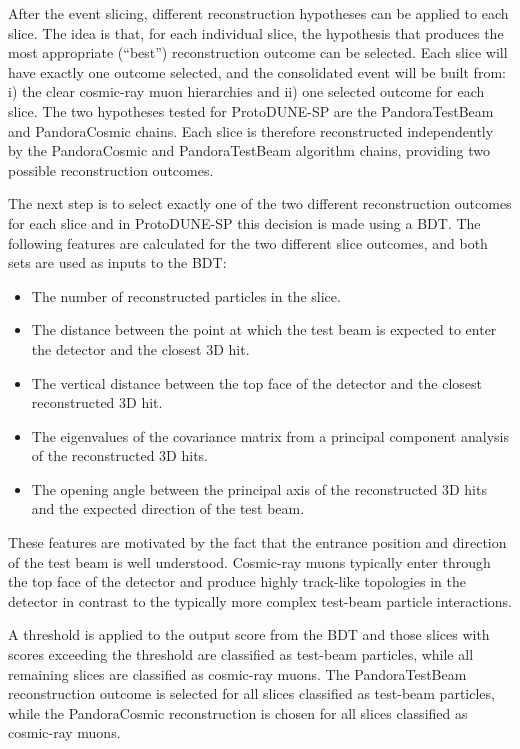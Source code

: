 \documentclass[epjc3]{svjour3}
\begin{document}
After the event slicing, different reconstruction hypotheses can be applied to each slice. The idea is that, for each individual slice, the hypothesis that produces the most appropriate (``best'') reconstruction outcome can be selected. Each slice will have exactly one outcome selected, and the consolidated event will be built from: i) the clear cosmic-ray muon hierarchies and ii) one selected outcome for each slice. The two hypotheses tested for ProtoDUNE-SP are the PandoraTestBeam and PandoraCosmic chains. Each slice is therefore reconstructed independently by the PandoraCosmic and PandoraTestBeam algorithm chains, providing two possible reconstruction outcomes.

The next step is to select exactly one of the two different reconstruction outcomes for each slice and in ProtoDUNE-SP this decision is made using a BDT. The following features are calculated for the two different slice outcomes, and both sets are used as inputs to the BDT:

\begin{itemize}
\item The number of reconstructed particles in the slice.
\item The distance between the point at which the test beam is expected to enter the detector and the closest 3D hit.
\item The vertical distance between the top face of the detector and the closest reconstructed 3D hit.
\item The eigenvalues of the covariance matrix from a principal component analysis of the reconstructed 3D hits.
\item The opening angle between the principal axis of the reconstructed 3D hits and the expected direction of the test beam.
\end{itemize}

These features are motivated by the fact that the entrance position and direction of the test beam is well understood. Cosmic-ray muons typically enter through the top face of the detector and produce highly track-like topologies in the detector in contrast to the typically more complex test-beam particle interactions.

A threshold is applied to the output score from the BDT and those slices with scores exceeding the threshold are classified as test-beam particles, while all remaining slices are classified as cosmic-ray muons. The PandoraTestBeam reconstruction outcome is selected for all slices classified as test-beam particles, while the PandoraCosmic reconstruction is chosen for all slices classified as cosmic-ray muons.
\end{document}
